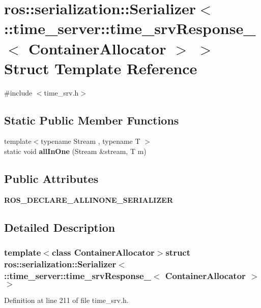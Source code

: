 \section{ros\-:\-:serialization\-:\-:\-Serializer$<$ \-:\-:time\-\_\-server\-:\-:time\-\_\-srv\-Response\-\_\-$<$ \-Container\-Allocator $>$ $>$ \-Struct \-Template \-Reference}
\label{structros_1_1serialization_1_1Serializer_3_01_1_1time__server_1_1time__srvResponse___3_01ContainerAllocator_01_4_01_4}


{\ttfamily \#include $<$time\-\_\-srv.\-h$>$}

\subsection*{\-Static \-Public \-Member \-Functions}
\begin{DoxyCompactItemize}
\item 
{\footnotesize template$<$typename Stream , typename T $>$ }\\static void {\bf all\-In\-One} (\-Stream \&stream, \-T m)
\end{DoxyCompactItemize}
\subsection*{\-Public \-Attributes}
\begin{DoxyCompactItemize}
\item 
{\bf \-R\-O\-S\-\_\-\-D\-E\-C\-L\-A\-R\-E\-\_\-\-A\-L\-L\-I\-N\-O\-N\-E\-\_\-\-S\-E\-R\-I\-A\-L\-I\-Z\-E\-R}
\end{DoxyCompactItemize}


\subsection{\-Detailed \-Description}
\subsubsection*{template$<$class Container\-Allocator$>$struct ros\-::serialization\-::\-Serializer$<$ \-::time\-\_\-server\-::time\-\_\-srv\-Response\-\_\-$<$ Container\-Allocator $>$ $>$}



\-Definition at line 211 of file time\-\_\-srv.\-h.



